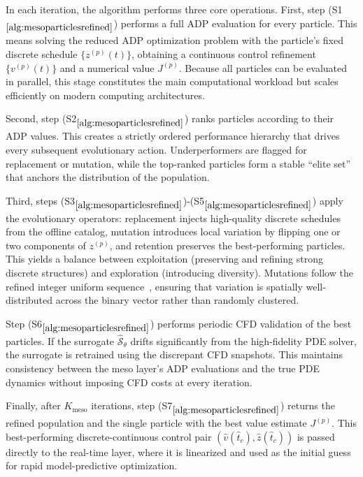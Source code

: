 \documentclass{article}
\newcommand{\1}{\mathds{1}}          %
\theoremstyle{definition}
\begin{document}
\begin{sloppypar}
In each iteration, the algorithm performs three core operations.  
First, step (S1$_{\ref{alg:mesoparticlesrefined}}$) performs a full ADP evaluation for every
particle. This means solving the reduced ADP optimization problem with the particle's
fixed discrete schedule $\{z^{(p)}(t)\}$, obtaining a continuous control refinement
$\{v^{(p)}(t)\}$ and a numerical value $J^{(p)}$.  
Because all particles can be evaluated in parallel, this stage constitutes the main
computational workload but scales efficiently on modern computing architectures.

Second, step (S2$_{\ref{alg:mesoparticlesrefined}}$) ranks particles according to their ADP
values. This creates a strictly ordered performance hierarchy that drives every subsequent
evolutionary action.  
Underperformers are flagged for replacement or mutation, while the top-ranked particles form
a stable “elite set” that anchors the distribution of the population.

Third, steps (S3$_{\ref{alg:mesoparticlesrefined}}$)-(S5$_{\ref{alg:mesoparticlesrefined}}$)
apply the evolutionary operators:
replacement injects high-quality discrete schedules from the offline catalog,
mutation introduces local variation by flipping one or two components of $z^{(p)}$, and
retention preserves the best-performing particles.  
This yields a balance between exploitation (preserving and refining strong discrete
structures) and exploration (introducing diversity).  
Mutations follow the refined integer uniform sequence~\cite{MATRS}, ensuring that variation
is spatially well-distributed across the binary vector rather than randomly clustered.

Step (S6$_{\ref{alg:mesoparticlesrefined}}$) performs periodic CFD validation of the best
particles.  
If the surrogate $\hat{\mathcal{S}}_{\theta}$ drifts significantly from the high-fidelity
PDE solver, the surrogate is retrained using the discrepant CFD snapshots.  
This maintains consistency between the meso layer’s ADP evaluations and the true PDE
dynamics without imposing CFD costs at every iteration.

Finally, after $K_{\mathrm{meso}}$ iterations, step (S7$_{\ref{alg:mesoparticlesrefined}}$)
returns the refined population and the single particle with the best value estimate
$J^{(p)}$.  
This best-performing discrete-continuous control pair
$(\hat v(\hat t_c),\hat z(\hat t_c))$ is passed directly to the real-time layer, where it is
linearized and used as the initial guess for rapid model-predictive optimization.


\end{sloppypar}
\end{document}
